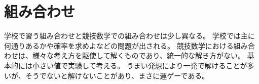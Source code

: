 \documentclass[uplatex,dvipdfmx]{jsbook}
\begin{document}
















\chapter{組み合わせ}
学校で習う組み合わせと競技数学での組み合わせは少し異なる。
学校では主に何通りあるかや確率を求めよなどの問題が出される。
競技数学における組み合わせは、様々な考え方を駆使して解くものであり、統一的な解き方がない。
基本的には小さい値で実験して考える。
うまい発想により一発で解けることが多いが、そうでないと解けないことがあり、まさに運ゲーである。
\end{document}
